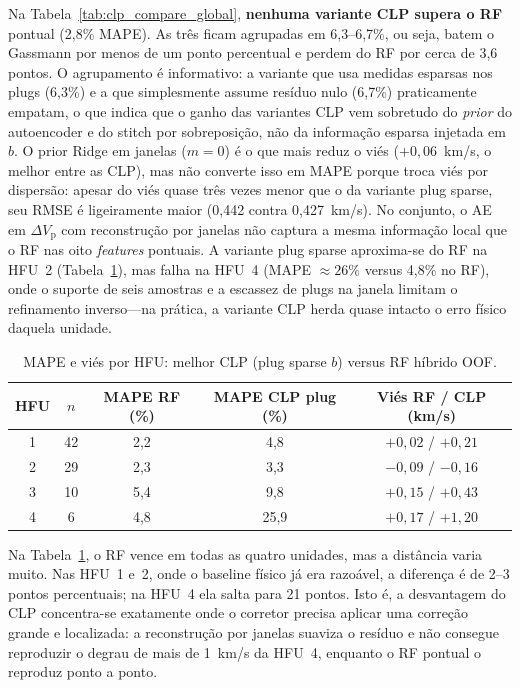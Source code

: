 \documentclass[11pt,a4paper]{article}
\numberwithin{equation}{section}
\begin{document}
Na Tabela~\ref{tab:clp_compare_global}, \textbf{nenhuma variante CLP supera o RF}
pontual (2,8\% MAPE).
As três ficam agrupadas em 6,3--6,7\%, ou seja, batem o Gassmann por menos de
um ponto percentual e perdem do RF por cerca de 3,6 pontos.
O agrupamento é informativo: a variante que usa medidas esparsas nos plugs
(6,3\%) e a que simplesmente assume resíduo nulo (6,7\%) praticamente empatam,
o que indica que o ganho das variantes CLP vem sobretudo do
\emph{prior} do autoencoder e do stitch por sobreposição, não da informação
esparsa injetada em $b$.
O prior Ridge em janelas ($m{=}0$) é o que mais reduz o viés
($+0{,}06$~km/s, o melhor entre as CLP), mas não converte isso em MAPE porque
troca viés por dispersão: apesar do viés quase três vezes menor que o da variante
plug sparse, seu RMSE é ligeiramente maior (0,442 contra 0,427~km/s).
No conjunto, o AE em $\Delta V_{\mathrm{p}}$ com reconstrução por janelas não
captura a mesma informação local que o RF nas oito \emph{features} pontuais.
A variante plug sparse aproxima-se do RF na HFU~2
(Tabela~\ref{tab:clp_hfu_compare}), mas falha na HFU~4
(MAPE $\approx 26\%$ versus 4,8\% no RF), onde o suporte de seis amostras
e a escassez de plugs na janela limitam o refinamento inverso---na prática,
a variante CLP herda quase intacto o erro físico daquela unidade.

\begin{table}[H]
  \centering
  \caption{MAPE e viés por HFU: melhor CLP (plug sparse $b$) versus RF híbrido OOF.}
  \label{tab:clp_hfu_compare}
  \begin{tabular}{ccccc}
    \toprule
    HFU & $n$ & MAPE RF (\%) & MAPE CLP plug (\%) &
    Viés RF / CLP (km/s) \\
    \midrule
    1 & 42 & 2,2 & 4,8 & $+0{,}02$ / $+0{,}21$ \\
    2 & 29 & 2,3 & 3,3 & $-0{,}09$ / $-0{,}16$ \\
    3 & 10 & 5,4 & 9,8 & $+0{,}15$ / $+0{,}43$ \\
    4 & 6  & 4,8 & 25,9 & $+0{,}17$ / $+1{,}20$ \\
    \bottomrule
  \end{tabular}
\end{table}

Na Tabela~\ref{tab:clp_hfu_compare}, o RF vence em todas as quatro unidades,
mas a distância varia muito.
Nas HFU~1 e~2, onde o baseline físico já era razoável, a diferença é de
2--3 pontos percentuais; na HFU~4 ela salta para 21 pontos.
Isto é, a desvantagem do CLP concentra-se exatamente onde o corretor precisa
aplicar uma correção grande e localizada: a reconstrução por janelas
suaviza o resíduo e não consegue reproduzir o degrau de mais de 1~km/s da
HFU~4, enquanto o RF pontual o reproduz ponto a ponto.
\end{document}
